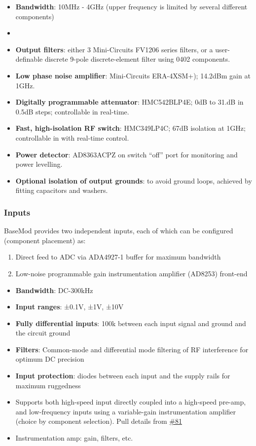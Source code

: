 \begin{itemize}

	\item
	\textbf{Bandwidth}: 10MHz - 4GHz (upper frequency is limited by
	several different components)
	\item
	\item
	\textbf{Output filters}: either 3 Mini-Circuits FV1206 series filters,
	or a user-definable discrete 9-pole discrete-element filter using 0402
	components.
	\item
	\textbf{Low phase noise amplifier}: Mini-Circuits ERA-4XSM+); 14.2dBm
	gain at 1GHz.
	\item
	\textbf{Digitally programmable attenuator}: HMC542BLP4E; 0dB to 31.dB
	in 0.5dB steps; controllable in real-time.
	\item
	\textbf{Fast, high-isolation RF switch}: HMC349LP4C; 67dB isolation at
	1GHz; controllable in with real-time control.
	\item
	\textbf{Power detector}: AD8363ACPZ on switch ``off'' port for
	monitoring and power levelling.
	\item
	\textbf{Optional isolation of output grounds}: to avoid ground loops,
	achieved by fitting capacitors and washers.
\end{itemize}

\subsubsection{Inputs}\label{inputs}

BaseMod provides two independent inputs, each of which can be configured
(component placement) as:

\begin{enumerate}
	\def\labelenumi{\arabic{enumi}.}
	\item
	Direct feed to ADC via ADA4927-1 buffer for maximum bandwidth
	\item
	Low-noise programmable gain instrumentation amplifier (AD8253)
	front-end
\end{enumerate}

\begin{itemize}
	\item
	\textbf{Bandwidth}: DC-300kHz
	\item
	\textbf{Input ranges}: ±0.1V, ±1V, ±10V
	\item
	\textbf{Fully differential inputs}: 100k between each input signal and
	ground and the circuit ground
	\item
	\textbf{Filters}: Common-mode and differential mode filtering of RF
	interference for optimum DC precision
	\item
	\textbf{Input protection}: diodes between each input and the supply
	rails for maximum ruggedness
	\item
	Supports both high-speed input directly coupled into a high-speed
	pre-amp, and low-frequency inputs using a variable-gain
	instrumentation amplifier (choice by component selection). Pull
	details from \href{https://github.com/m-labs/sinara/issues/81}{\#81}
	\item
	Instrumentation amp: gain, filters, etc.
\end{itemize}

